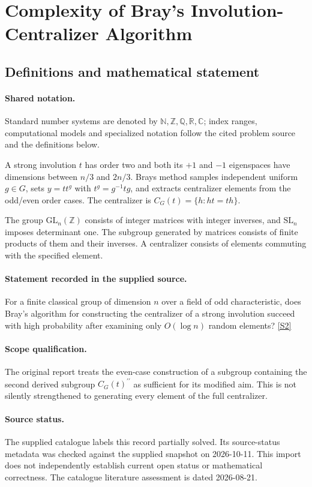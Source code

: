 \documentclass[11pt]{article}
\newcommand{\sref}[2]{\hyperlink{source:#1:#2}{[S#2]}}
\begin{document}
\section{Complexity of Bray’s Involution-Centralizer Algorithm}\label{statement}

\subsection{Definitions and mathematical statement}

\paragraph{Shared notation.}Standard number systems are denoted by $\mathbb N,\mathbb Z,\mathbb Q,\mathbb R,\mathbb C$; index ranges, computational models and specialized notation follow the cited problem source and the definitions below.


A strong involution $t$ has order two and both its $+1$ and $-1$ eigenspaces have dimensions between $n/3$ and $2n/3$. Bray\textquotesingle s method samples independent uniform $g\in G$, sets $y=tt^g$ with $t^g=g^{-1}tg$, and extracts centralizer elements from the odd/even order cases. The centralizer is $C_G(t)=\{h:ht=th\}$.

The group $\mathrm{GL}_n(\mathbb Z)$ consists of integer matrices with integer inverses, and $\mathrm{SL}_n$ imposes determinant one. The subgroup generated by matrices consists of finite products of them and their inverses. A centralizer consists of elements commuting with the specified element.
\paragraph{Statement recorded in the supplied source.}
For a finite classical group of dimension $n$ over a field of odd characteristic, does Bray's algorithm for constructing the centralizer of a strong involution succeed with high probability after examining only $O(\log n)$ random elements? \sref{statement}{2}
\paragraph{Scope qualification.}
The original report treats the even-case construction of a subgroup containing the second derived subgroup $C_G(t)^{\prime\prime}$ as sufficient for its modified aim. This is not silently strengthened to generating every element of the full centralizer.
\paragraph{Source status.}
The supplied catalogue labels this record partially solved. Its source-status metadata was checked against the supplied snapshot on 2026-10-11. This import does not independently establish current open status or mathematical correctness. The catalogue literature assessment is dated 2026-08-21.
\end{document}
